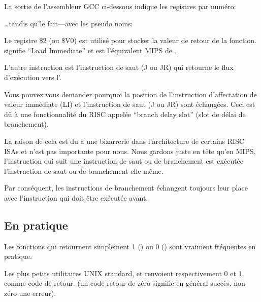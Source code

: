 La sortie de l'assembleur GCC ci-dessous indique les registres par numéro:



\dots tandis qu'\IDA le fait---avec les pseudo noms:



Le registre \$2 (ou \$V0) est utilisé pour stocker la valeur de retour de la fonction.
 signifie ``Load Immediate'' et est l'équivalent MIPS de \MOV.


L'autre instruction est l'instruction de saut (J ou JR) qui retourne le flux d'exécution vers l'.


Vous pouvez vous demander pourquoi la position de l'instruction d'affectation de
valeur immédiate (LI) et l'instruction de saut (J ou JR) sont échangées. Ceci est
dû à une fonctionnalité du \ac{RISC} appelée ``branch delay slot'' (slot de délai
de branchement).

La raison de cela est du à une bizarrerie dans l'architecture de certains RISC \ac{ISA}s et n'est pas importante pour nous. Nous gardons juste en tête qu'en MIPS, l'instruction qui suit une instruction de saut ou de branchement est exécutée  l'instruction de saut ou de branchement elle-même.

Par conséquent, les instructions de branchement échangent toujours leur place avec l'instruction qui doit être exécutée avant.


\subsection{En pratique}

Les fonctions qui retournent simplement 1 () ou 0 () sont vraiment fréquentes en pratique.

Les plus petits utilitaires UNIX standard,  et  renvoient
respectivement 0 et 1, comme code de retour.
(un code retour de zéro signifie en général succès, non-zéro une erreur).

